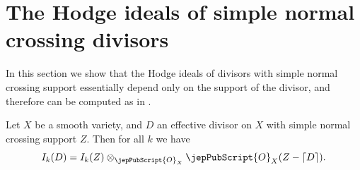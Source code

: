 \section{The Hodge ideals of simple normal crossing divisors}\label{SNC}
In this section we show that the Hodge ideals of divisors with simple normal crossing support essentially depend only on the support of the divisor, and therefore can be computed as in \cite[\S8]{MP1}.

\begin{proposition}\label{Hodge_ideals_SNC}
Let $X$ be a smooth variety, and $D$ an effective divisor on $X$ with simple normal crossing  support $Z$. Then for all $k$ we have 
$$I_k(D)=I_k(Z)\otimes_{\jepPubScript{O}_X} \jepPubScript{O}_X(Z - \lceil D \rceil).$$
\end{proposition}

